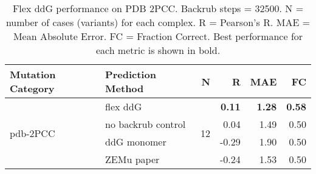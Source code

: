 \begin{table}
  \begin{tabular}{llrrrr}
\toprule
Mutation Category &   Prediction Method &   N &     R &  MAE &   FC \\
\midrule
 \multirow{ 4}{*}{pdb-2PCC} & flex ddG & \multirow{ 4}{*}{12} & \textbf{0.11} & \textbf{1.28} & \textbf{0.58}  \\
 & no backrub control & & 0.04 & 1.49 & 0.50  \\
 & ddG monomer & & -0.29 & 1.90 & 0.50  \\
 & ZEMu paper & & -0.24 & 1.53 & 0.50  \\
\bottomrule
\end{tabular}
  \caption[Flex ddG performance on PDB 2PCC]{
    Flex ddG performance on PDB 2PCC. Backrub steps = 32500. N = number of cases (variants) for each complex. R = Pearson's R. MAE = Mean Absolute Error. FC = Fraction Correct. Best performance for each metric is shown in bold.
  } \label{tab:table-pdb-2PCC}
\end{table}
